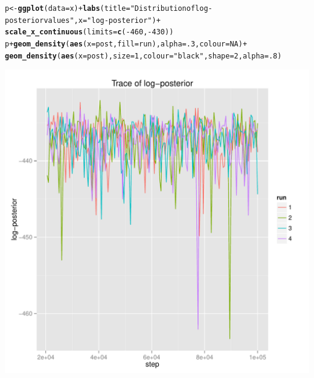 \documentclass{article}\usepackage[]{graphicx}\usepackage[]{color}
\makeatletter
\newcommand{\hlnum}[1]{\textcolor[rgb]{0.686,0.059,0.569}{#1}}%
\newcommand{\hlstr}[1]{\textcolor[rgb]{0.192,0.494,0.8}{#1}}%
\newcommand{\hlopt}[1]{\textcolor[rgb]{0,0,0}{#1}}%
\newcommand{\hlstd}[1]{\textcolor[rgb]{0.345,0.345,0.345}{#1}}%
\newcommand{\hlkwb}[1]{\textcolor[rgb]{0.69,0.353,0.396}{#1}}%
\newcommand{\hlkwc}[1]{\textcolor[rgb]{0.333,0.667,0.333}{#1}}%
\newcommand{\hlkwd}[1]{\textcolor[rgb]{0.737,0.353,0.396}{\textbf{#1}}}%
\newenvironment{kframe}{%
 \def\at@end@of@kframe{}%
 \ifinner\ifhmode%
  \def\at@end@of@kframe{\end{minipage}}%
  \begin{minipage}{\columnwidth}%
 \fi\fi%
 \def\FrameCommand##1{\hskip\@totalleftmargin \hskip-\fboxsep
 \colorbox{shadecolor}{##1}\hskip-\fboxsep
     \hskip-\linewidth \hskip-\@totalleftmargin \hskip\columnwidth}%
 \MakeFramed {\advance\hsize-\width
   \@totalleftmargin\z@ \linewidth\hsize
   \@setminipage}}%
 {\par\unskip\endMakeFramed%
 \at@end@of@kframe}
\newenvironment{knitrout}{}{} %
\makeatother
\begin{document}
\begin{knitrout}
\color{fgcolor}\begin{kframe}
\begin{alltt}
\hlstd{p} \hlkwb{<-} \hlkwd{ggplot}\hlstd{(}\hlkwc{data}\hlstd{=x)} \hlopt{+} \hlkwd{labs}\hlstd{(}\hlkwc{title}\hlstd{=}\hlstr{"Distribution of log-posterior values"}\hlstd{,} \hlkwc{x}\hlstd{=}\hlstr{"log-posterior"}\hlstd{)} \hlopt{+}
    \hlkwd{scale_x_continuous}\hlstd{(}\hlkwc{limits}\hlstd{=}\hlkwd{c}\hlstd{(}\hlopt{-}\hlnum{460}\hlstd{,}\hlopt{-}\hlnum{430}\hlstd{))}
\hlstd{p} \hlopt{+} \hlkwd{geom_density}\hlstd{(}\hlkwd{aes}\hlstd{(}\hlkwc{x}\hlstd{=post,} \hlkwc{fill}\hlstd{=run),} \hlkwc{alpha}\hlstd{=}\hlnum{.3}\hlstd{,} \hlkwc{colour}\hlstd{=}\hlnum{NA}\hlstd{)} \hlopt{+}
    \hlkwd{geom_density}\hlstd{(}\hlkwd{aes}\hlstd{(}\hlkwc{x}\hlstd{=post),} \hlkwc{size}\hlstd{=}\hlnum{1}\hlstd{,} \hlkwc{colour}\hlstd{=}\hlstr{"black"}\hlstd{,} \hlkwc{shape}\hlstd{=}\hlnum{2}\hlstd{,} \hlkwc{alpha}\hlstd{=}\hlnum{.8}\hlstd{)}
\end{alltt}
\end{kframe}

{\centering \includegraphics[width=.6\textwidth]{figs/unnamed-chunk-15} 

}



\end{knitrout}
\end{document}
